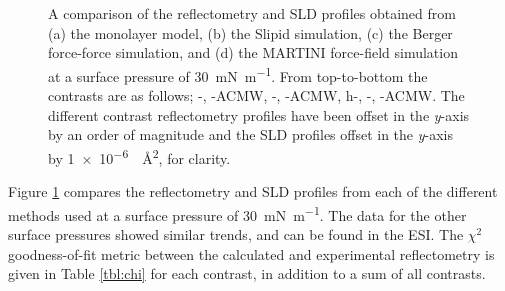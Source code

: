 \documentclass[twoside,twocolumn,9pt]{article}
\begin{document}
\begin{figure}
 \caption{A comparison of the reflectometry and SLD profiles obtained from (a) the monolayer model, (b) the Slipid simulation, (c) the Berger force-force simulation, and (d) the MARTINI force-field simulation at a surface pressure of \SI{30}{\milli\newton\per\meter}. From top-to-bottom the contrasts are as follows; -, -ACMW, -, -ACMW, h-, -, -ACMW. The different contrast reflectometry profiles have been offset in the \emph{y}-axis by an order of magnitude and the SLD profiles offset in the \emph{y}-axis by \SI{1e-6}{\per\square\angstrom}, for clarity.}
 \label{fig:ref}
\end{figure}
%
Figure \ref{fig:ref} compares the reflectometry and SLD profiles from each of the different methods used at a surface pressure of \SI{30}{\milli\newton\per\meter}.
The data for the other surface pressures showed similar trends, and can be found in the ESI.
The $\chi^2$ goodness-of-fit metric between the calculated and experimental reflectometry is given in Table \ref{tbl:chi} for each contrast, in addition to a sum of all contrasts.
%
\end{document}
